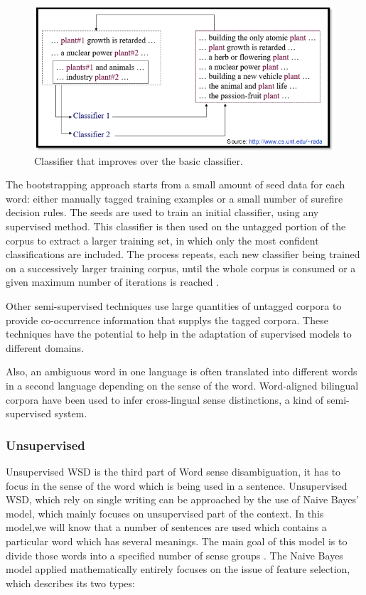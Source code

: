 \begin{figure}[tbh]
	\begin{center}
		\includegraphics[width=\columnwidth]{Union_Background_Chart_semi}
	\end{center}
	\caption{Classifier that improves over the basic classifier. \label{fig3}}
\end{figure}

The bootstrapping approach starts from a small amount of seed data for each word: either manually tagged training examples or a small number of surefire decision rules. 
The seeds are used to train an initial classifier, using any supervised method. 
This classifier is then used on the untagged portion of the corpus to extract a larger training set, in which only the most confident classifications are included. 
The process repeats, each new classifier being trained on a successively larger training corpus, until the whole corpus is consumed or a given maximum number of iterations is reached \cite{Blascheck2016}.

Other semi-supervised techniques use large quantities of untagged corpora to provide co-occurrence information that supplys the tagged corpora. 
These techniques have the potential to help in the adaptation of supervised models to different domains.

Also, an ambiguous word in one language is often translated into different words in a second language depending on the sense of the word. 
Word-aligned bilingual corpora have been used to infer cross-lingual sense distinctions, a kind of semi-supervised system.\cite{Cheslow2014}

\subsubsection*{Unsupervised}
Unsupervised WSD is the third part of Word sense disambiguation, it has to focus in the sense of the word which is being used in a sentence. 
Unsupervised WSD, which rely on single writing can be approached by the use of Naive Bayes' model, which mainly focuses on unsupervised part of the context. 
In this model,we will know that a number of sentences are used which contains a particular word which has several meanings. 
The main goal of this model is to divide those words into a specified number of sense groups \cite{4028513}. 
The Naive Bayes model applied mathematically entirely focuses on the issue of feature selection, which describes its two types:

